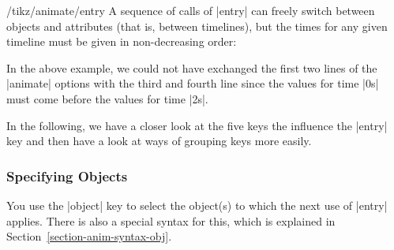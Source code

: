 \begin{key}{/tikz/animate/entry}
    A sequence of calls of |entry| can freely switch between objects and
    attributes (that is, between timelines), but the times for any given
    timeline must be given in non-decreasing order:
\begin{codeexample}[imagesource={standalone/pgfmanual-en-tikz-animations-animation-8.svg}]
\end{codeexample}
    In the above example, we could not have exchanged the first two lines of
    the |animate| options with the third and fourth line since the values for
    time |0s| must come before the values for time |2s|.
\end{key}

In the following, we have a closer look at the five keys the influence the
|entry| key and then have a look at ways of grouping keys more easily.


\subsubsection{Specifying Objects}
\label{section-anim-def-obj}

You use the |object| key to select the object(s) to which the next use of
|entry| applies. There is also a special syntax for this, which is explained in
Section~\ref{section-anim-syntax-obj}.

